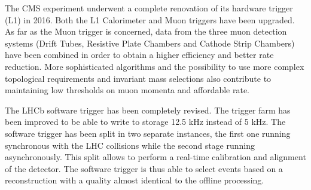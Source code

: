 The CMS experiment underwent a complete renovation of its hardware trigger (L1) in 2016.
Both the L1 Calorimeter and Muon triggers have been upgraded.
As far as the Muon trigger is concerned, data from the three muon detection systems (Drift Tubes, Resistive Plate Chambers and Cathode Strip Chambers) have been combined in order to obtain a higher efficiency and better rate reduction. 
More sophisticated algorithms and the possibility to use more complex topological requirements and invariant mass selections also contribute to maintaining low thresholds on muon momenta and affordable rate.

The LHCb software trigger has been completely revised. 
The trigger farm has been improved to be able to write to storage 12.5 kHz instead of 5 kHz.
The software trigger has been split in two separate instances, the first one running synchronous with the LHC collisions while the second stage running asynchronously. 
This split allows to perform a real-time calibration and alignment of the detector. 
The software trigger is thus able to select events based on a reconstruction with a quality almost identical to the offline processing.
%  